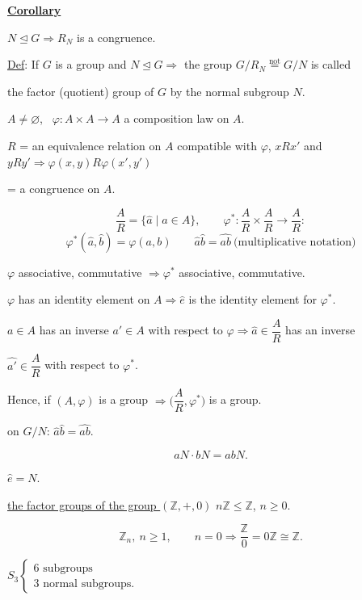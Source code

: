\noindent\underline{\textbf{Corollary}}

\bigskip
\noindent $N\trianglelefteq G \Rightarrow R_N$ is a congruence.

\bigskip
\noindent\underline{Def}: If $G$ is a group and $N\trianglelefteq G \Rightarrow$ the group $G/R_N \overset{\text{not}}{=} G/N$ is called

\noindent the factor (quotient) group of $G$ by the normal subgroup $N$.

\bigskip
\noindent $A\neq\varnothing$, \ $\varphi: A\times A\to A$ a composition law on $A$.

\noindent $R$ = an equivalence relation on $A$ compatible with $\varphi$, \quad $xRx'$ and $yRy' \Rightarrow \varphi(x,y)R\varphi(x',y')$

\noindent = a congruence on $A$.

\[
\frac{A}{R} = \{\hat a \mid a\in A\}, \qquad \varphi^*: \frac{A}{R}\times\frac{A}{R} \to \frac{A}{R}:
\]
\[
\varphi^*(\hat a,\hat b) = \varphi(a,b) \qquad \hat a\hat b=\widehat{ab} \ \text{(multiplicative notation)}
\]

\bigskip
\noindent $\varphi$ associative, commutative $\Rightarrow \varphi^*$ associative, commutative.

\noindent $\varphi$ has an identity element on $A \Rightarrow \hat e$ is the identity element for $\varphi^*$.

\noindent $a\in A$ has an inverse $a'\in A$ with respect to $\varphi \Rightarrow \hat a\in \dfrac{A}{R}$ has an inverse

\noindent $\hat{a'}\in \dfrac{A}{R}$ with respect to $\varphi^*$.

\bigskip
\noindent Hence, if $(A,\varphi)$ is a group $\Rightarrow \Big(\dfrac{A}{R},\varphi^*\Big)$ is a group.

\bigskip
\noindent on $G/N$: \quad $\hat a\hat b = \widehat{ab}$.

\[
aN\cdot bN = abN.
\]

\noindent $\hat e = N$.

\bigskip
\noindent\underline{the factor groups of the group $(\mathbb{Z},+,0)$} \quad $n\mathbb{Z}\leq \mathbb{Z}$, $n\geq 0$.

\[
\mathbb{Z}_n, \ n\geq 1, \qquad n=0 \Rightarrow \frac{\mathbb{Z}}{0} = 0\mathbb{Z} \cong \mathbb{Z}.
\]

\noindent $S_3 \begin{cases} 6 \text{ subgroups} \\ 3 \text{ normal subgroups.} \end{cases}$

